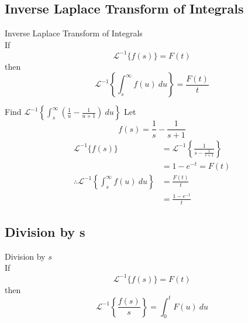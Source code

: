 \documentclass[12pt]{article}
\newcommand{\Lapinv}{\mathscr{L}^{-1}}
\begin{document}
\subsection{Inverse Laplace Transform of Integrals}

\begin{theorem}{Inverse Laplace Transform of Integrals}{}
    \\If \[
        \Lapinv \{ f(s) \} = F(t)
    \] then \[
        \Lapinv \left\{ \int_{s}^{\infty} {f(u)} \: d{u} \right\} = \frac{F(t)}{t}
    \]
\end{theorem}

\begin{example}{Find $\displaystyle \Lapinv \left\{ \int_{s}^{\infty} {\left( \frac{1}{u} - \frac{1}{u+1} \right)} \: d{u} \right\}$}{}
    Let \[
        f(s) = \frac{1}{s} - \frac{1}{s+1}
    \]
    \begin{align*}
        \Lapinv \{ f(s) \} &= \Lapinv \left\{ \frac{1}{s - \frac{1}{s+1}} \right\} \\
        &= 1 - e^{-t} = F(t) \\
        \therefore \Lapinv \left\{ \int_{s}^{\infty} {f(u)} \: d{u} \right\} &= \frac{F(t)}{t} \\
        &= \frac{1-e^{-t}}{t}
    \end{align*}
\end{example}


\subsection{Division by s}

\begin{theorem}{Division by $s$}{}
    \\If \[
        \Lapinv \{ f(s) \} = F(t)
    \] then \[
        \Lapinv \left\{ \frac{f(s)}{s} \right\} = \int_{0}^{t} {F(u)} \: d{u}
    \]
\end{theorem}
\end{document}
